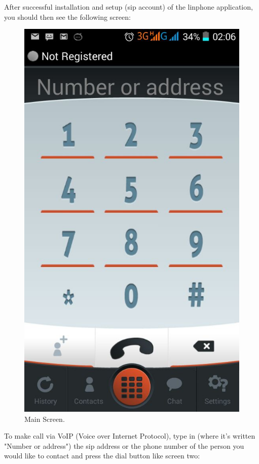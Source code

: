 \documentclass[a4paper]{article}
\begin{document}
After successful installation and setup (sip account) of the linphone application, you should then see the following screen:

\begin{center}
\begin{figure}[H]
\centering
\includegraphics[width=0.7\linewidth]{pictures/home.png}
\caption{\label{fig:Screen1}Main Screen.}
\end{figure}
\end{center}

To make call via VoIP (Voice over Internet Protocol), type in (where it's written "Number or address") the sip address or the phone number of the person you would like to contact and press the dial button like screen two:
\end{document}
